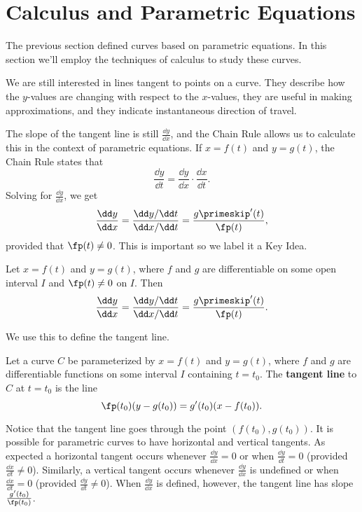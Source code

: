 \section{Calculus and Parametric Equations}\label{sec:par_calc}

The previous section defined curves based on parametric equations. In this section we'll employ the techniques of calculus to study these curves.

We are still interested in lines tangent to points on a curve. They describe how the $y$-values are changing with respect to the $x$-values, they are useful in making approximations, and they indicate instantaneous direction of travel.

The slope of the tangent line is still $\frac{\dd y}{\dd x}$, and the Chain Rule allows us to calculate this in the context of parametric equations. If $x=f(t)$ and $y=g(t)$, the Chain Rule states that
\[\frac{\dd y}{\dd t} = \frac{\dd y}{\dd x}\cdot\frac{\dd x}{\dd t}.\]
Solving for $\frac{\dd y}{\dd x}$, we get 
\[\frac{\dd y}{\dd x} = \frac{\dd y/\dd t}{\dd x/\dd t} = \frac{g\primeskip'(t)}{\fp(t)},\]
provided that $\fp(t)\neq 0$. This is important so we label it a Key Idea.

\begin{keyidea}\label{idea:dydxpar}%
Let $x=f(t)$ and $y=g(t)$, where $f$ and $g$ are differentiable on some open interval $I$ and $\fp(t)\neq 0$ on $I$. Then 
\[
\frac{\dd y}{\dd x}=\frac{\dd y/\dd t}{\dd x/\dd t}=\frac{g\primeskip'(t)}{\fp(t)}.
\]
\end{keyidea}

We use this to define the tangent line.

\begin{definition}\label{def:tangent_par}%
Let a curve $C$ be parameterized by $x=f(t)$ and $y=g(t)$, where $f$ and $g$ are differentiable functions on some interval $I$ containing $t=t_0$. The 
\textbf{tangent line} to $C$ at $t=t_0$ is the line
\[\fp(t_0)(y-g(t_0))=g'(t_0)(x-f(t_0)).\]
\end{definition}

Notice that the tangent line goes through the point $(f(t_0),g(t_0))$.  It is possible for parametric curves to have horizontal and vertical tangents. As expected a horizontal tangent occurs whenever $\frac{\dd y}{\dd x} = 0$ or when $\frac{\dd y}{\dd t} = 0$ (provided $\frac{\dd x}{\dd t} \neq 0$). Similarly, a vertical tangent occurs whenever $\frac{\dd y}{\dd x}$ is undefined or when $\frac{\dd x}{\dd t} = 0$ (provided $\frac{\dd y}{\dd t} \neq 0$).  When $\frac{\dd y}{\dd x}$ is defined, however, the tangent line has slope $\frac{g'(t_0)}{\fp(t_0)}$.

